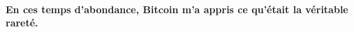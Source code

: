 \paragraph{En ces temps d'abondance, Bitcoin m'a appris ce qu'était la véritable
rareté.}

%
%
%
%
%
%
%

